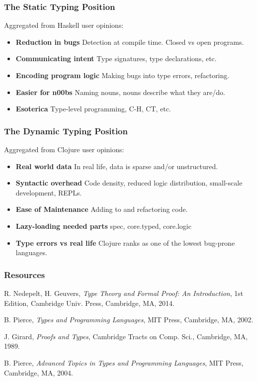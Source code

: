 \documentclass{beamer}
\begin{document}
\begin{frame}
  \frametitle{The Static Typing Position}
  Aggregated from Haskell user opinions:
  \begin{itemize}
  \item \textbf{Reduction in bugs} Detection at compile time.  Closed vs open programs.
  \item \textbf{Communicating intent} Type signatures, type declarations, etc.
  \item \textbf{Encoding program logic} Making bugs into type errors, refactoring.
  \item \textbf{Easier for n00bs} Naming nouns, nouns describe what they are/do.
  \item \textbf{Esoterica} Type-level programming, C-H, CT, etc.
  \end{itemize}
\end{frame}

\begin{frame}
  \frametitle{The Dynamic Typing Position}
  Aggregated from Clojure user opinions:
  \begin{itemize}
  \item \textbf{Real world data} In real life, data is sparse and/or unstructured.
  \item \textbf{Syntactic overhead} Code density, reduced logic distribution,
    small-scale development, REPLs.
  \item \textbf{Ease of Maintenance} Adding to and refactoring code.
  \item \textbf{Lazy-loading needed parts} spec, core.typed, core.logic
  \item \textbf{Type errors vs real life} Clojure ranks as one of the lowest bug-prone
    languages.
  \end{itemize}

\end{frame}

\begin{frame}
  \frametitle{Resources}
  \begin{thebibliography}{9}

   R. Nedepelt, H. Geuvers, \emph{Type Theory and Formal Proof: An
      Introduction}, 1st Edition, Cambridge Univ. Press, Cambridge, MA, 2014.

   B. Pierce, \emph{Types and Programming Languages}, MIT
    Press, Cambridge, MA, 2002.

   J. Girard, \emph{Proofs and Types}, Cambridge Tracts on
    Comp. Sci., Cambridge, MA, 1989.

   B. Pierce, \emph{Advanced Topics in Types and Programming
      Languages}, MIT Press, Cambridge, MA, 2004.


  \end{thebibliography}
\end{frame}
\end{document}
